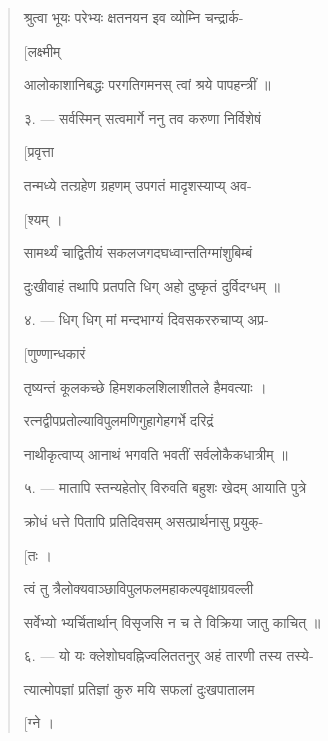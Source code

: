 \documentclass[a4paper, 11pt, oneside, french]{article}
\begin{document}
\begin{quotation}
\texthindi{श्रुत्वा भूयः परेभ्यः क्षतनयन इव व्योम्नि चन्द्रार्क-}

\hspace*{65mm}\texthindi{[लक्ष्मीम्}

\texthindi{आलोकाशानिबद्धः परगतिगमनस् त्वां श्रये पापहन्त्रीं ॥}

\bigskip

\texthindi{३}. --- \texthindi{सर्वस्मिन् सत्वमार्गे ननु तव करुणा निर्विशेषं}

\hspace*{65mm}\texthindi{[प्रवृत्ता}

\texthindi{तन्मध्ये तत्ग्रहेण ग्रहणम् उपगतं मादृशस्याप्य् अव-}

\hspace*{65mm}\texthindi{[श्यम् ।}

\texthindi{सामर्थ्यं चाद्वितीयं सकलजगदघध्वान्ततिग्मांशुबिम्बं}

\texthindi{दुःखीवाहं तथापि प्रतपति धिग् अहो दुष्कृतं दुर्विदग्धम् ॥}

\bigskip

\texthindi{४}. --- \texthindi{धिग् धिग् मां मन्दभाग्यं दिवसकररुचाप्य् अप्र-}

\hspace*{65mm}\texthindi{[णुण्णान्धकारं}

\texthindi{तृष्यन्तं कूलकच्छे हिमशकलशिलाशीतले हैमवत्याः ।}

\texthindi{रत्नद्वीपप्रतोल्याविपुलमणिगुहागेहगर्भे दरिद्रं}

\texthindi{नाथीकृत्वाप्य् आनाथं भगवति भवतीं सर्वलोकैकधात्रीम् ॥}

\bigskip

\texthindi{५}. --- \texthindi{मातापि स्तन्यहेतोर् विरुवति बहुशः खेदम् आयाति पुत्रे}

\texthindi{क्रोधं धत्ते पितापि प्रतिदिवसम् असत्प्रार्थनासु प्रयुक्-}

\hspace*{65mm}\texthindi{[तः ।}

\texthindi{त्वं तु त्रैलोक्यवाञ्छाविपुलफलमहाकल्पवृक्षाग्रवल्ली}

\texthindi{सर्वेभ्यो भ्यर्चितार्थान् विसृजसि न च ते विक्रिया जातु काचित् ॥}

\bigskip

\texthindi{६}. --- \texthindi{यो यः क्लेशोघवह्निज्वलिततनुर् अहं तारणी तस्य तस्ये-}

\texthindi{त्यात्मोपज्ञां प्रतिज्ञां कुरु मयि सफलां दुःखपातालम}

\hspace*{65mm}\texthindi{[ग्ने ।}


\end{quotation}
\end{document}
